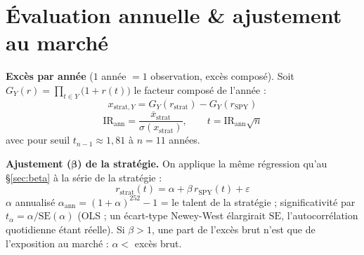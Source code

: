 \documentclass[10pt,a4paper,twocolumn]{article}
\begin{document}
\section{Évaluation annuelle \& ajustement au marché}
\textbf{Excès par année} ($1$ année $=1$ observation, excès composé). Soit
$G_Y(r)=\prod_{t\in Y}\big(1+r(t)\big)$ le facteur composé de l'année :
$$x_{\text{strat},Y}=G_Y(r_{\text{strat}})-G_Y(r_{\text{SPY}})$$
$$\mathrm{IR}_{\text{ann}}=\frac{\overline{x}_{\text{strat}}}{\sigma(x_{\text{strat}})},\qquad
  t=\mathrm{IR}_{\text{ann}}\sqrt{n}$$
avec pour seuil $t_{n-1}\approx 1{,}81$ à $n=11$ années.

\textbf{Ajustement (}$\boldsymbol\beta$\textbf{) de la stratégie.} On applique la même régression
qu'au \S\ref{sec:beta} à la série de la stratégie :
$$\boxed{\,r_{\text{strat}}(t)=\alpha+\beta\,r_{\text{SPY}}(t)+\varepsilon\,}$$
$\alpha$ annualisé $\alpha_{\text{ann}}=(1+\alpha)^{252}-1$ = le talent de la stratégie ; significativité par
$t_\alpha=\alpha/\mathrm{SE}(\alpha)$ (OLS ; un écart-type Newey-West élargirait $\mathrm{SE}$,
l'autocorrélation quotidienne étant réelle). Si $\beta>1$, une part de l'excès brut n'est que de
l'exposition au marché : $\alpha<$ excès brut.
\end{document}
